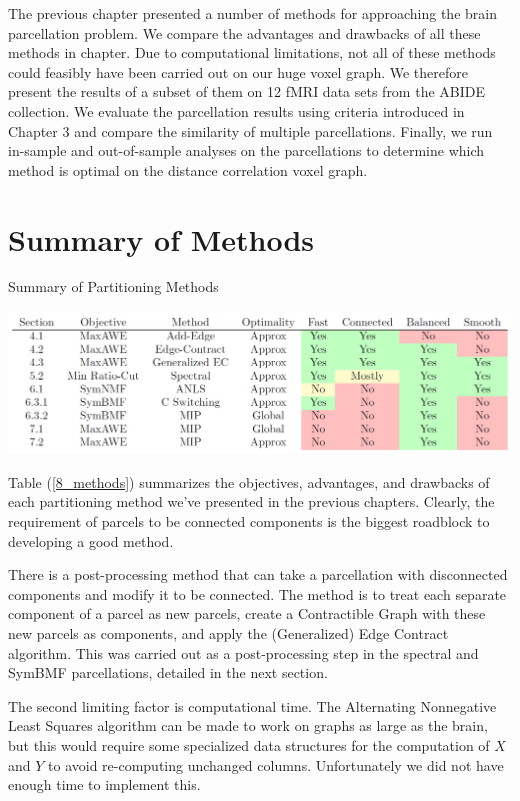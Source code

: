 The previous chapter presented a number of methods for approaching
the brain parcellation problem. We compare the advantages and drawbacks
of all these methods in chapter. Due to computational limitations, not
all of these methods could feasibly have been carried out on our huge
voxel graph. We therefore present the results of a subset of them on
12 fMRI data sets from the ABIDE collection. We evaluate the
parcellation results using criteria introduced in Chapter 3 and compare
the similarity of multiple parcellations. Finally, we run in-sample
and out-of-sample analyses on the parcellations to determine which
method is optimal on the distance correlation voxel graph.

\section{Summary of Methods}

\begin{table}
\caption{Summary of Partitioning Methods}
\label{8_methods}
\includegraphics[scale = 0.5]{figs/8_methods.png}
\end{table}

Table (\ref{8_methods}) summarizes the objectives, advantages, and
drawbacks of each partitioning method we've presented in the previous
chapters. Clearly, the requirement of parcels to be connected components
is the biggest roadblock to developing a good method.

There is a post-processing method that can take a parcellation with
disconnected components and modify it to be connected. The method is to
treat each separate component of a parcel as new parcels, create a
Contractible Graph with these new parcels as components, and apply the
(Generalized) Edge Contract algorithm. This was carried out as a
post-processing step in the spectral and SymBMF parcellations, detailed
in the next section.

The second limiting factor is computational time. The Alternating
Nonnegative Least Squares algorithm can be made to work on graphs as
large as the brain, but this would require some specialized data
structures for the computation of $X$ and $Y$ to avoid re-computing
unchanged columns. Unfortunately we did not have enough time to
implement this.

